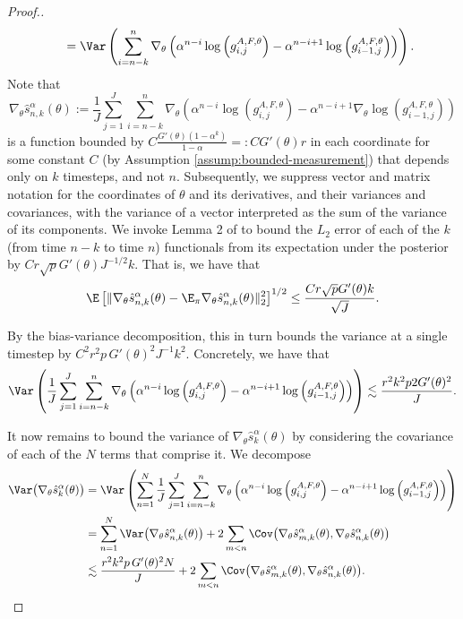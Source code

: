\begin{proof}[Proof.]
\begin{align}
    &\qquad = \Var \left(\sum_{i=n-k}^n \nabla_\theta\left(\alpha^{n-i} \log\left(g_{i,j}^{A,F,\theta}\right)- \alpha^{n-i+1}\log\left(g_{i-1,j}^{A,F,\theta}\right)\right)\right).
\end{align}
Note that 
\begin{equation}
\nabla_\theta \hat s_{n,k}^\alpha(\theta) := \frac{1}{J}\sum_{j=1}^J\sum_{i=n-k}^n \nabla_\theta\left(\alpha^{n-i} \log\left(g_{i,j}^{A,F,\theta}\right)- \alpha^{n-i+1} \nabla_\theta \log\left(g_{i-1,j}^{A,F,\theta}\right)\right)
\end{equation} 
is a function bounded by $C\frac{G'(\theta)(1-\alpha^k)}{1-\alpha} =: CG'(\theta)r$ in each coordinate for some constant $C$ (by Assumption \ref{assump:bounded-measurement}) that depends only on $k$ timesteps, and not $n$. 
Subsequently, we suppress vector and matrix notation for the coordinates of $\theta$ and its derivatives, and their variances and covariances, with the variance of a vector interpreted as the sum of the variance of its components.
We invoke Lemma 2 of \cite{karjalainen23} to bound the $L_2$ error of each of the $k$ (from time $n-k$ to time $n$) functionals from its expectation under the posterior by $Cr\sqrt{p}G'(\theta)J^{-1/2}k$. 
That is, we have that
\begin{equation}\E\left[\|\nabla_\theta \hat s_{n,k}^\alpha(\theta) - \E_{\pi}\nabla_\theta \hat s_{n,k}^\alpha(\theta)\|_2^2\right]^{1/2} \leq \frac{Cr\sqrt{p}G'(\theta) k}{\sqrt{J}}.\end{equation}


By the bias-variance decomposition, this in turn bounds the variance at a single timestep by $C^2r^2p \, G'(\theta)^2J^{-1}k^2$. Concretely, we have that
\begin{equation}\Var\left(\frac{1}{J}\sum_{j=1}^J\sum_{i=n-k}^n \nabla_\theta\left(\alpha^{n-i} \log\left(g_{i,j}^{A,F,\theta}\right)- \alpha^{n-i+1} \log\left(g_{i-1,j}^{A,F,\theta}\right)\right)\right) \lesssim \frac{r^2k^2p2G'(\theta)^2}{J}.\end{equation}

It now remains to bound the variance of $\nabla_\theta \hat s_k^\alpha(\theta)$ by considering the covariance of each of the $N$ terms that comprise it. 
We decompose
\begin{align}
    \Var\big(\nabla_\theta \hat s_k^\alpha(\theta)\big) &= \Var\left(\sum_{n=1}^N \frac{1}{J}\sum_{j=1}^J\sum_{i=n-k}^n \nabla_\theta\left(\alpha^{n-i} \log\left(g_{i,j}^{A,F,\theta}\right)- \alpha^{n-i+1} \log\left(g_{i-1,j}^{A,F,\theta}\right)\right)\right)
    \nonumber \\
    &= \sum_{n=1}^N\Var\big(\nabla_\theta \hat s_{n,k}^\alpha(\theta)\big)+ 2\sum_{m<n}\Cov\big(\nabla_\theta \hat s_{m,k}^\alpha(\theta), \nabla_\theta \hat s_{n,k}^\alpha(\theta)\big) \\
    &\lesssim \frac{r^2k^2p \, G'(\theta)^2N}{J} + 2\sum_{m<n}\Cov\big(\nabla_\theta \hat s_{m,k}^\alpha(\theta), \nabla_\theta \hat s_{n,k}^\alpha(\theta)\big).
\end{align}


\end{proof}
